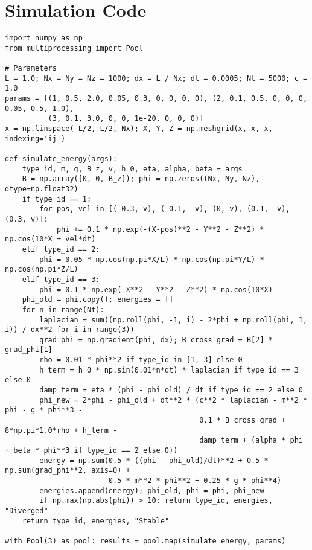 \documentclass[11pt]{article}
\begin{document}
\section{Simulation Code}
\lstset{language=Python, basicstyle=\footnotesize\ttfamily, breaklines=true, numbers=left}
\begin{lstlisting}
import numpy as np
from multiprocessing import Pool

# Parameters
L = 1.0; Nx = Ny = Nz = 1000; dx = L / Nx; dt = 0.0005; Nt = 5000; c = 1.0
params = [(1, 0.5, 2.0, 0.05, 0.3, 0, 0, 0, 0), (2, 0.1, 0.5, 0, 0, 0, 0.05, 0.5, 1.0), 
          (3, 0.1, 3.0, 0, 0, 1e-20, 0, 0, 0)]
x = np.linspace(-L/2, L/2, Nx); X, Y, Z = np.meshgrid(x, x, x, indexing='ij')

def simulate_energy(args):
    type_id, m, g, B_z, v, h_0, eta, alpha, beta = args
    B = np.array([0, 0, B_z]); phi = np.zeros((Nx, Ny, Nz), dtype=np.float32)
    if type_id == 1:
        for pos, vel in [(-0.3, v), (-0.1, -v), (0, v), (0.1, -v), (0.3, v)]:
            phi += 0.1 * np.exp(-(X-pos)**2 - Y**2 - Z**2) * np.cos(10*X + vel*dt)
    elif type_id == 2:
        phi = 0.05 * np.cos(np.pi*X/L) * np.cos(np.pi*Y/L) * np.cos(np.pi*Z/L)
    elif type_id == 3:
        phi = 0.1 * np.exp(-X**2 - Y**2 - Z**2) * np.cos(10*X)
    phi_old = phi.copy(); energies = []
    for n in range(Nt):
        laplacian = sum((np.roll(phi, -1, i) - 2*phi + np.roll(phi, 1, i)) / dx**2 for i in range(3))
        grad_phi = np.gradient(phi, dx); B_cross_grad = B[2] * grad_phi[1]
        rho = 0.01 * phi**2 if type_id in [1, 3] else 0
        h_term = h_0 * np.sin(0.01*n*dt) * laplacian if type_id == 3 else 0
        damp_term = eta * (phi - phi_old) / dt if type_id == 2 else 0
        phi_new = 2*phi - phi_old + dt**2 * (c**2 * laplacian - m**2 * phi - g * phi**3 - 
                                             0.1 * B_cross_grad + 8*np.pi*1.0*rho + h_term - 
                                             damp_term + (alpha * phi + beta * phi**3 if type_id == 2 else 0))
        energy = np.sum(0.5 * ((phi - phi_old)/dt)**2 + 0.5 * np.sum(grad_phi**2, axis=0) + 
                        0.5 * m**2 * phi**2 + 0.25 * g * phi**4)
        energies.append(energy); phi_old, phi = phi, phi_new
        if np.max(np.abs(phi)) > 10: return type_id, energies, "Diverged"
    return type_id, energies, "Stable"

with Pool(3) as pool: results = pool.map(simulate_energy, params)
\end{lstlisting}



\end{document}
